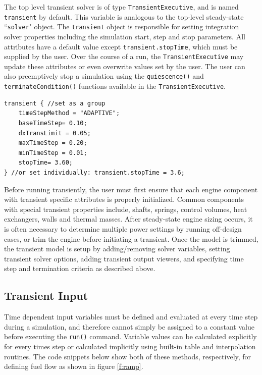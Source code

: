 \documentclass[heading.tex]{subfiles}
\begin{document}
The top level transient solver is of type \texttt{TransientExecutive}, and is named
\texttt{transient} by default. This variable is analogous to the top-level steady-state 
``\texttt{solver}" object. The \texttt{transient} object is responsible for setting integration
solver properties including the simulation start, step and stop parameters. \cite[chap.~7.5]{NPSS}
\cite[chap.~15.1.8]{NPSS}  All attributes have a default value except \texttt{transient.stopTime},
which must be supplied by the user. Over the course of a run, the \texttt{TransientExecutive} may
update these attributes or even overwrite values set by the user. The user can also preemptively
stop a simulation using the  \texttt{quiescence()} and  \texttt{terminateCondition()} functions
available in the \texttt{TransientExecutive}.

\begin{adjustwidth}{0cm}{0cm}
 \begin{verbatim}
transient { //set as a group
	timeStepMethod = "ADAPTIVE";
	baseTimeStep= 0.10;
	dxTransLimit = 0.05;
	maxTimeStep = 0.20;
	minTimeStep = 0.01;
	stopTime= 3.60;
} //or set individually: transient.stopTime = 3.6;
 \end{verbatim}
 \end{adjustwidth} 

Before running transiently, the user must first ensure that each engine component with transient
specific attributes is properly initialized. Common components with special transient properties
include, shafts, springs, control volumes, heat exchangers, walls and thermal masses.
After steady-state engine sizing occurs, it is often necessary to determine multiple power
settings by running off-design cases, or trim the engine before initiating a transient. Once the
model is trimmed, the transient model is setup by adding/removing solver variables, setting
transient solver options, adding transient output viewers, and specifying time step and
termination criteria as described above.

\subsection{Transient Input}

Time dependent input variables must be defined and evaluated at every time step during a simulation, and therefore cannot simply be
assigned to a constant value before executing the \texttt{run()} command. Variable values can be calculated explicitly for every times
step or calculated implicitly using built-in table and interpolation routines. The code snippets below show both of these methods,
respectively, for defining fuel flow as shown in figure \ref{f:ramp}.
\end{document}
